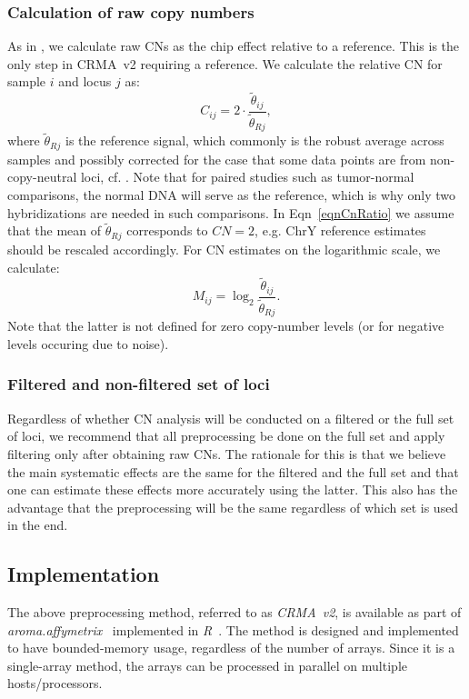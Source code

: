 \documentclass{bioinfo}
\newcommand{\pkg}[1]{\textit{#1}\xspace}
\newcommand{\CN}{CN\xspace}
\begin{document}
\subsubsection{Calculation of raw copy numbers}
\label{secRawCN}
As in \citet{BengtssonH_etal_2008a}, we calculate raw CNs as the chip effect relative to a reference.  This is the only step in CRMA~v2 requiring a reference.
We calculate the relative \CN for sample $i$ and locus $j$ as:
\begin{equation}
  C_{ij} = 2 \cdot \frac{\tilde\theta_{ij}}{\tilde\theta_{Rj}},
  \label{eqnCnRatio}
\end{equation}
where $\tilde\theta_{Rj}$ is the reference signal, which commonly is the robust average across samples and possibly corrected for the case that some data points are from non-copy-neutral loci, cf. \citet{BengtssonH_etal_2008a}.
Note that for paired studies such as tumor-normal comparisons, the normal DNA will serve as the reference, which is why only two hybridizations are needed in such comparisons.
In Eqn~\eqref{eqnCnRatio} we assume that the mean of $\tilde\theta_{Rj}$ corresponds to $\CN=2$, e.g. ChrY reference estimates should be rescaled accordingly.
For \CN estimates on the logarithmic scale, we calculate:
\begin{equation}
  M_{ij} = \log_2 \frac{\tilde\theta_{ij}}{\tilde\theta_{Rj}}.
  \label{eqnCnLogRatio}
\end{equation}
Note that the latter is not defined for zero copy-number levels (or for negative levels occuring due to noise).


\subsubsection{Filtered and non-filtered set of loci}
Regardless of whether CN analysis will be conducted on a filtered or the full set of loci, we recommend that all preprocessing be done on the full set and apply filtering only after obtaining raw CNs.  %
The rationale for this is that we believe the main systematic effects are the same for the filtered and the full set and that one can estimate these effects more accurately using the latter.
This also has the advantage that the preprocessing will be the same regardless of which set is used in the end.


\subsection{Implementation}
The above preprocessing method, referred to as \emph{CRMA~v2}, is available as part of \pkg{aroma.affymetrix}~\citep{BengtssonH_etal_2008b} implemented in \pkg{R}~\citep{RDevel_2008}.
The method is designed and implemented to have bounded-memory usage, regardless of the number of arrays.
Since it is a single-array method, the arrays can be processed in parallel on multiple hosts/processors.
\end{document}
